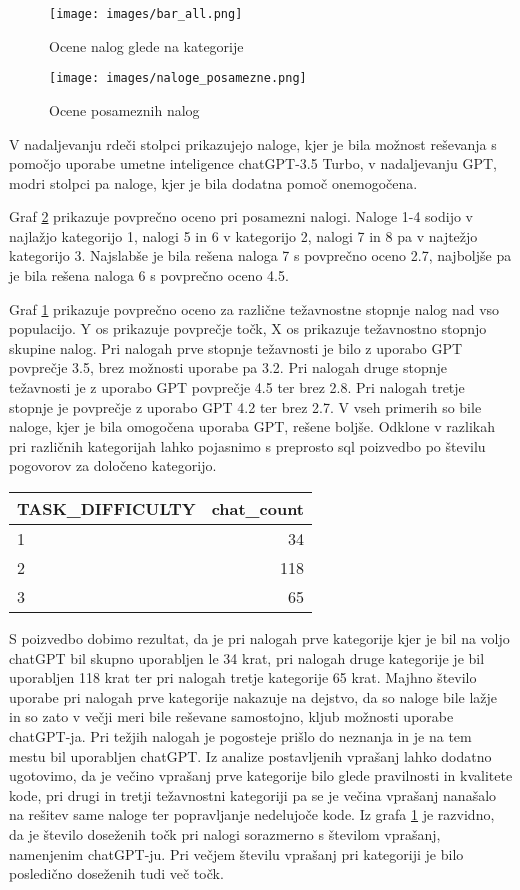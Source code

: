 \documentclass[a4paper,12pt,openright]{book}
\begin{document}
\begin{figure}[H]
    \centering
    \texttt{[image: images/bar\_all.png]}
    \caption{Ocene nalog glede na kategorije}
    \label{fig:bar_all}
\end{figure}

\begin{figure}[H]
    \centering
    \texttt{[image: images/naloge\_posamezne.png]}
    \caption{Ocene posameznih nalog}
    \label{fig:grade_all}
\end{figure}
 V nadaljevanju rdeči stolpci prikazujejo naloge, kjer je bila možnost reševanja s pomočjo uporabe umetne inteligence chatGPT-3.5 Turbo, v nadaljevanju GPT, modri stolpci pa naloge, kjer je bila dodatna pomoč onemogočena.

Graf \ref{fig:grade_all} prikazuje povprečno oceno pri posamezni nalogi. Naloge 1-4 sodijo v najlažjo kategorijo 1, nalogi 5 in 6 v kategorijo 2, nalogi 7 in 8 pa v najtežjo kategorijo 3. Najslabše je bila rešena naloga 7 s povprečno oceno 2.7, najboljše pa je bila rešena naloga 6 s povprečno oceno 4.5.


Graf \ref{fig:bar_all} prikazuje povprečno oceno za različne težavnostne stopnje nalog nad vso populacijo. Y os prikazuje povprečje točk, X os prikazuje težavnostno stopnjo skupine nalog.
Pri nalogah prve stopnje težavnosti je bilo z uporabo GPT povprečje 3.5, brez možnosti uporabe pa 3.2. Pri nalogah druge stopnje težavnosti je z uporabo GPT povprečje 4.5 ter brez 2.8. Pri nalogah tretje stopnje je povprečje z uporabo GPT 4.2 ter brez 2.7. V vseh primerih so bile naloge, kjer je bila omogočena uporaba GPT, rešene boljše. 
Odklone v razlikah pri različnih kategorijah lahko pojasnimo s preprosto sql poizvedbo po številu pogovorov za določeno kategorijo.

\begin{tabular}{|l|r|}
\hline
\textbf{TASK\_DIFFICULTY} & \textbf{chat\_count} \\
\hline
1 & 34 \\
\hline
2 & 118 \\
\hline
3 & 65 \\
\hline
\end{tabular}
\newline
\newline
S poizvedbo dobimo rezultat, da je pri nalogah prve kategorije kjer je bil na voljo chatGPT bil skupno uporabljen le 34 krat, pri nalogah druge kategorije je bil uporabljen 118 krat ter pri nalogah tretje kategorije 65 krat. Majhno število uporabe pri nalogah prve kategorije nakazuje na dejstvo, da so naloge bile lažje in so zato v večji meri bile reševane samostojno, kljub možnosti uporabe chatGPT-ja. Pri težjih nalogah je pogosteje prišlo do neznanja in je na tem mestu bil uporabljen chatGPT. Iz analize postavljenih vprašanj lahko dodatno ugotovimo, da je večino vprašanj prve kategorije bilo glede pravilnosti in kvalitete kode, pri drugi in tretji težavnostni kategoriji pa se je večina vprašanj nanašalo na rešitev same naloge ter popravljanje nedelujoče kode.
Iz grafa \ref{fig:bar_all} je razvidno, da je število doseženih točk pri nalogi sorazmerno s številom vprašanj, namenjenim chatGPT-ju. Pri večjem številu vprašanj pri kategoriji je bilo posledično doseženih tudi več točk. 
\end{document}
